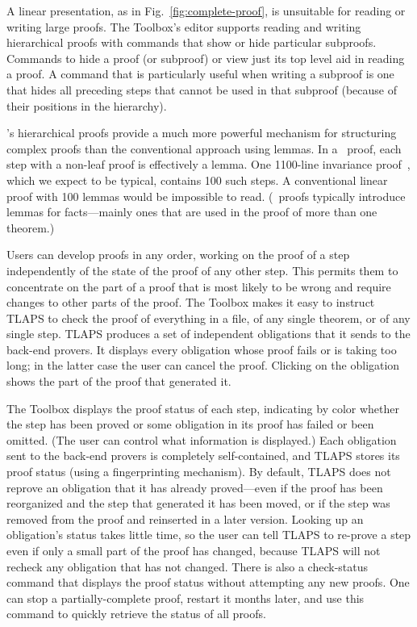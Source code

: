 \documentclass[a4paper]{llncs}
\begin{document}
A linear presentation, as in Fig.~\ref{fig:complete-proof}, is
unsuitable for reading or writing large proofs.  The Toolbox's editor
supports reading and writing hierarchical proofs with commands that
show or hide particular subproofs.  Commands to hide a proof (or
subproof) or view just its top level aid in reading a proof.  A
command that is particularly useful when writing a subproof is one
that hides all preceding steps that cannot be used in that subproof
(because of their positions in the hierarchy).

\tlaplus's hierarchical proofs provide a much more powerful mechanism
for structuring complex proofs than the conventional approach using
lemmas.  In a \tlaplus\ proof, each step with a non-leaf proof is
effectively a lemma.  One 1100-line invariance
proof~\cite{lamport:byzantine-paxos}, which we expect to be typical,
contains 100 such steps.  A conventional linear proof with 100 lemmas
would be impossible to read.  (\tlaplus\ proofs typically introduce
lemmas for facts---mainly ones that are used in the proof of more than
one theorem.)

Users can develop proofs in any order, working on the proof of a step
independently of the state of the proof of any other step.  This
permits them to concentrate on the part of a proof that is most likely
to be wrong and require changes to other parts of the proof.  The
Toolbox makes it easy to instruct TLAPS to check the proof of
everything in a file, of any single theorem, or of any single step.
TLAPS produces a set of independent obligations that it sends to the
back-end provers.  It displays every obligation whose proof fails or
is taking too long; in the latter case the user can cancel the proof.
Clicking on the obligation shows the part of the proof that generated
it.



The Toolbox displays the proof status of each step, indicating by
color whether the step has been proved or some obligation in its proof
has failed or been omitted.  (The user can control what information is
displayed.)  Each obligation sent to the back-end provers is
completely self-contained, and TLAPS stores its proof status (using a
fingerprinting mechanism).  By default, TLAPS does not 
reprove an
obligation that it has already proved---even if the proof has been
reorganized and the step that generated it has been moved, or if the
step was removed from the proof and reinserted in a later version.
Looking up an obligation's status takes little time, so the user can
tell TLAPS to re-prove a step even if only a small part of the proof
has changed, because TLAPS will not recheck any obligation that
has not changed.  There is also a check-status command that 
displays the proof status without attempting any new proofs.  One can
stop a partially-complete proof, restart it months later, and use this
command to quickly retrieve the status of all proofs.
\end{document}
